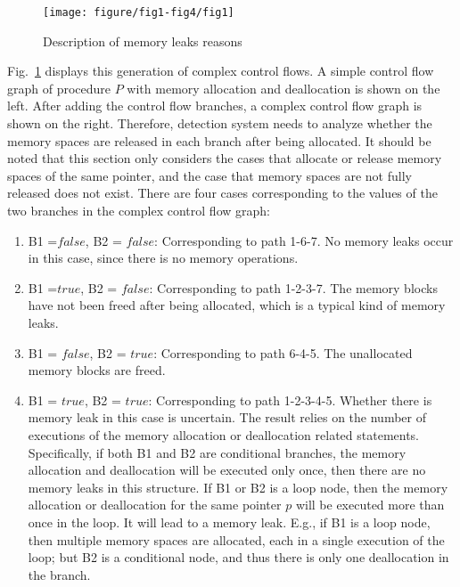 
\begin{figure}[!h]
\center
\texttt{[image: figure/fig1-fig4/fig1]}
\caption{Description of memory leaks reasons}
\label{fig:1}
\end{figure}

Fig.~\ref{fig:1} displays this generation of complex control flows. A simple control flow graph of procedure $P$ with memory allocation and deallocation is shown on the left. After adding the control flow branches, a complex control flow graph is shown on the right. Therefore, detection system needs to analyze whether the memory spaces are released in each branch after being allocated. It should be noted that this section only considers the cases that allocate or release memory spaces of the same pointer, and the case that memory spaces are not fully released does not exist. There are four cases corresponding to the values of the two branches in the complex control flow graph:
\begin{enumerate}
\item
B1 =$\mathit{false}$, B2 = $\mathit{false}$: Corresponding to path 1-6-7. No memory leaks occur in this case, since there is no memory operations.
\item
B1 =$\mathit{true}$, B2 = $\mathit{false}$: Corresponding to path 1-2-3-7. The memory blocks have not been freed after being allocated, which is a typical kind of memory leaks.
\item 
B1 = $\mathit{false}$, B2 = $\mathit{true}$: Corresponding to path 6-4-5. The unallocated memory blocks are freed.
\item
B1 = $\mathit{true}$, B2 = $\mathit{true}$: Corresponding to path 1-2-3-4-5. Whether there is memory leak in this case is uncertain. The result relies on the number of executions of the memory allocation or deallocation related statements. Specifically, if both B1 and B2 are conditional branches, the memory allocation and deallocation will be executed only once, then there are no memory leaks in this structure. If B1 or B2 is a loop node, then the memory allocation or deallocation for the same pointer $p$ will be executed more than once in the loop. It will lead to a memory leak. E.g., if B1 is a loop node, then multiple memory spaces are allocated, each in a single execution of the loop; but B2 is a conditional node, and thus there is only one deallocation in the branch. %
\end{enumerate}

